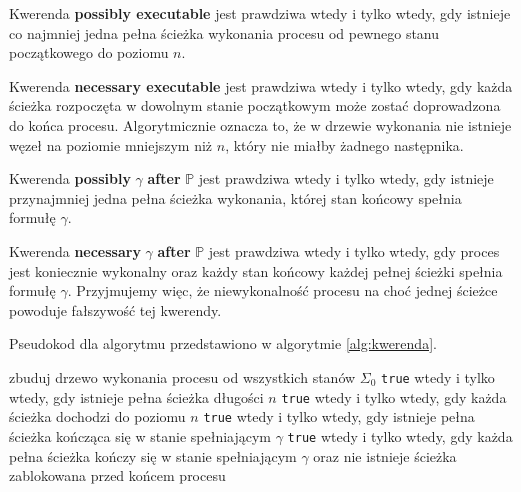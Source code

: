\documentclass[11pt,a4paper]{article}
\theoremstyle{definition}
\begin{document}
Kwerenda \textbf{possibly executable} jest prawdziwa wtedy i tylko wtedy, gdy istnieje co najmniej jedna pełna ścieżka wykonania procesu od pewnego stanu początkowego do poziomu $n$.

Kwerenda \textbf{necessary executable} jest prawdziwa wtedy i tylko wtedy, gdy każda ścieżka rozpoczęta w dowolnym stanie początkowym może zostać doprowadzona do końca procesu. Algorytmicznie oznacza to, że w drzewie wykonania nie istnieje węzeł na poziomie mniejszym niż $n$, który nie miałby żadnego następnika.

Kwerenda \textbf{possibly} $\gamma$ \textbf{after} $\mathbb{P}$ jest prawdziwa wtedy i tylko wtedy, gdy istnieje przynajmniej jedna pełna ścieżka wykonania, której stan końcowy spełnia formułę $\gamma$.

Kwerenda \textbf{necessary} $\gamma$ \textbf{after} $\mathbb{P}$ jest prawdziwa wtedy i tylko wtedy, gdy proces jest koniecznie wykonalny oraz każdy stan końcowy każdej pełnej ścieżki spełnia formułę $\gamma$. Przyjmujemy więc, że niewykonalność procesu na choć jednej ścieżce powoduje fałszywość tej kwerendy.

Pseudokod dla algorytmu przedstawiono w algorytmie \ref{alg:kwerenda}.

\begin{algorithm}[H]
\caption{Pseudokod dla algorytmu wykonującego kwerendę}
\label{alg:kwerenda}
\begin{algorithmic}[1]
        \State zbuduj drzewo wykonania procesu od wszystkich stanów $\Sigma_0$
            \Return \texttt{true} wtedy i tylko wtedy, gdy istnieje pełna ścieżka długości $n$
        \EndIf
            \Return \texttt{true} wtedy i tylko wtedy, gdy każda ścieżka dochodzi do poziomu $n$
        \EndIf
            \Return \texttt{true} wtedy i tylko wtedy, gdy istnieje pełna ścieżka
                    kończąca się w stanie spełniającym $\gamma$
        \EndIf
            \Return \texttt{true} wtedy i tylko wtedy, gdy każda pełna ścieżka kończy się
                    w stanie spełniającym $\gamma$ oraz nie istnieje ścieżka zablokowana
                    przed końcem procesu
        \EndIf
    \EndProcedure
\end{algorithmic}
\end{algorithm}
\end{document}
